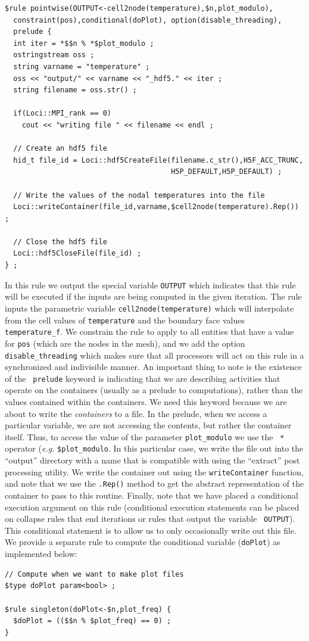 \documentclass[10pt,epsf,letterpaper,twoside]{book}
\begin{document}
\newpage
\begin{verbatim}
$rule pointwise(OUTPUT<-cell2node(temperature),$n,plot_modulo),
  constraint(pos),conditional(doPlot), option(disable_threading),
  prelude {
  int iter = *$$n % *$plot_modulo ;
  ostringstream oss ;
  string varname = "temperature" ;
  oss << "output/" << varname << "_hdf5." << iter ;
  string filename = oss.str() ;

  if(Loci::MPI_rank == 0)
    cout << "writing file " << filename << endl ;

  // Create an hdf5 file
  hid_t file_id = Loci::hdf5CreateFile(filename.c_str(),H5F_ACC_TRUNC,
                                       H5P_DEFAULT,H5P_DEFAULT) ;

  // Write the values of the nodal temperatures into the file
  Loci::writeContainer(file_id,varname,$cell2node(temperature).Rep()) ;

  // Close the hdf5 file
  Loci::hdf5CloseFile(file_id) ;
} ;
\end{verbatim}
In this rule we output the special variable {\tt OUTPUT} which
indicates that this rule will be executed if the inputs are being
computed in the given iteration.  The rule inputs the parametric
variable {\tt cell2node(temperature)} which will interpolate from the
cell values of {\tt temperature} and the boundary face values {\tt
  temperature\_f}.  We constrain the rule to apply to all entities that
have a value for {\tt pos} (which are the nodes in the mesh), and we
add the option {\tt disable\_threading} which makes sure that all
processors will act on this rule in a synchronized and indivisible
manner.  An important thing to note is the existence of the {\tt
  prelude} keyword is indicating that we are describing activities
that operate on the containers (usually as a prelude to computations),
rather than the values contained within the containers.  We need this
keyword because we are about to write the {\it containers} to a file.
In the prelude, when we access a particular variable, we are not
accessing the contents, but rather the container itself.  Thus, to
access the value of the parameter {\tt plot\_modulo} we use the {\tt
  *} operator ({\it e.g.} {\tt *\$plot\_modulo}.  In this particular
case, we write the file out into the ``output'' directory with a name
that is compatible with using the ``extract'' post processing
utility.  We write the container out using the {\tt writeContainer}
function, and note that we use the {\tt .Rep()} method to get the
abstract representation of the container to pass to this routine.
Finally, note that we have placed a conditional execution argument on
this rule (conditional execution statements can be placed on collapse
rules that end iterations or rules that output the variable {\tt
  OUTPUT}).  This conditional statement is to allow us to only
occasionally write out this file.  We provide a separate rule to
compute the conditional variable ({\tt doPlot}) as implemented below:
\newpage
\begin{verbatim}
// Compute when we want to make plot files
$type doPlot param<bool> ;

$rule singleton(doPlot<-$n,plot_freq) {
  $doPlot = (($$n % $plot_freq) == 0) ;
}
\end{verbatim}
\end{document}
